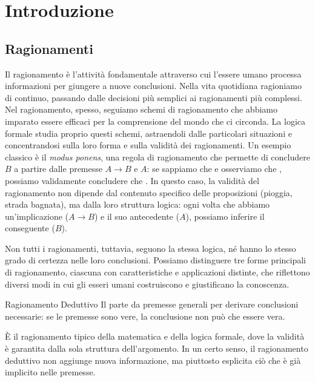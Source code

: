 \chapter{Introduzione}

\section{Ragionamenti}

Il ragionamento è l'attività fondamentale attraverso cui l'essere umano processa informazioni per giungere a nuove conclusioni.
Nella vita quotidiana ragioniamo di continuo, passando dalle decisioni più semplici ai ragionamenti più complessi. Nel ragionamento, spesso, seguiamo schemi di ragionamento che abbiamo imparato essere efficaci per la comprensione del mondo che ci circonda.
La logica formale studia proprio questi schemi, astraendoli dalle particolari situazioni e concentrandosi sulla loro forma e sulla validità dei ragionamenti.
Un esempio classico è il \textit{modus ponens}, una regola di ragionamento che permette di concludere \(B\) a partire dalle premesse \(A \rightarrow B\) e \(A\): se sappiamo che  e osserviamo che , possiamo validamente concludere che .
In questo caso, la validità del ragionamento non dipende dal contenuto specifico delle proposizioni (pioggia, strada bagnata), ma dalla loro struttura logica: ogni volta che abbiamo un'implicazione (\(A \rightarrow B\)) e il suo antecedente (\(A\)), possiamo inferire il conseguente (\(B\)).

Non tutti i ragionamenti, tuttavia, seguono la stessa logica, né hanno lo stesso grado di certezza nelle loro conclusioni.
Possiamo distinguere tre forme principali di ragionamento, ciascuna con caratteristiche e applicazioni distinte, che riflettono diversi modi in cui gli esseri umani costruiscono e giustificano la conoscenza.

\begin{definition}{Ragionamento Deduttivo}
  Il  parte da premesse generali per derivare conclusioni necessarie: se le premesse sono vere, la conclusione non può che essere vera.
\end{definition}

È il ragionamento tipico della matematica e della logica formale, dove la validità è garantita dalla sola struttura dell'argomento.
In un certo senso, il ragionamento deduttivo non aggiunge nuova informazione, ma piuttosto esplicita ciò che è già implicito nelle premesse.


